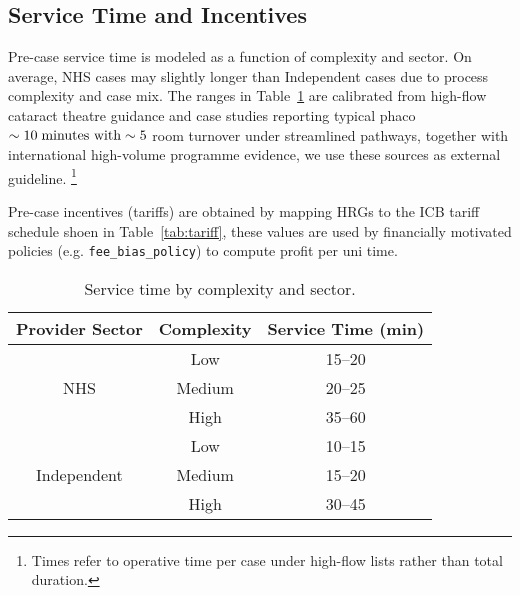 \documentclass[ %
                    author={Nattanan Nawakitbamrung},
                supervisor={Dr. Sébastien Rochat},
                    degree={MSc},
                     title={Developing and Evaluating the Impact of a Single Patient Treatment List (PTL) for an NHS Integrated Care System},
                  subtitle={},
                      type={},
                      year={2025}]{dissertation}
\begin{document}
\subsection{Service Time and Incentives}
Pre-case service time is modeled as a function of complexity and sector. On average, NHS cases may slightly longer than Independent cases due to process complexity and case mix. The ranges in Table~\ref{tab:service-time} are calibrated from high-flow cataract theatre guidance and case studies reporting typical phaco $\sim 10 \hspace{0.1cm}\text{minutes with} \sim 5$ room turnover under streamlined pathways, together with international high-volume programme evidence, we use these sources as external guideline. \cite{ACIHighVolume2015, NHSConfedCataract2023, RCOphthHighFlow2022} \footnote{Times refer to operative time per case under high-flow lists rather than total duration.}

Pre-case incentives (tariffs) are obtained by mapping HRGs to the ICB tariff schedule shoen in Table~\ref{tab:tariff}, these values are used by financially motivated policies (e.g. \texttt{fee\_bias\_policy}) to compute profit per uni time. \cite{NottsICB2023}

\begin{table}[htbp]
    \begin{center}
        \begin{tabular}{ c c c } 
            \hline
            \textbf{Provider Sector} & \textbf{Complexity} & \textbf{Service Time (min)} \\
            \hline
            \multirow{3}{4em}{NHS} & Low & 15--20 \\ 
            & Medium & 20--25 \\ 
            & High & 35--60 \\ 
            \hline
            \multirow{3}{4em}{Independent} & Low & 10--15 \\ 
            & Medium & 15--20 \\ 
            & High & 30--45 \\ 
            \hline
        \end{tabular}
        \end{center}
        \caption{Service time by complexity and sector.}
        \label{tab:service-time}
\end{table}
\end{document}
